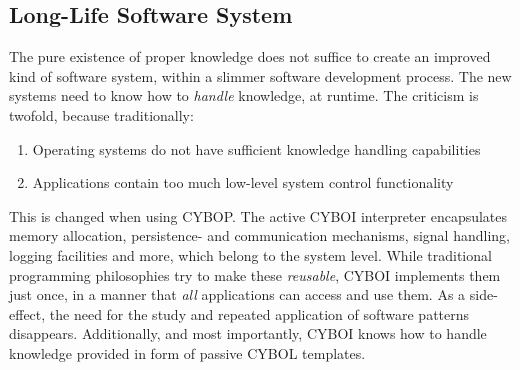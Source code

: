 %
%
%
%
%
%
%

\subsection{Long-Life Software System}
\label{long-life_software_system_heading}

The pure existence of proper knowledge does not suffice to create an improved
kind of software system, within a slimmer software development process. The new
systems need to know how to \emph{handle} knowledge, at runtime. The criticism
is twofold, because traditionally:

\begin{enumerate}
    \item Operating systems do not have sufficient knowledge handling capabilities
    \item Applications contain too much low-level system control functionality
\end{enumerate}

This is changed when using CYBOP. The active CYBOI interpreter encapsulates
memory allocation, persistence- and communication mechanisms, signal handling,
logging facilities and more, which belong to the system level. While
traditional programming philosophies try to make these \emph{reusable}, CYBOI
implements them just once, in a manner that \emph{all} applications can access
and use them. As a side-effect, the need for the study and repeated application
of software patterns disappears. Additionally, and most importantly, CYBOI
knows how to handle knowledge provided in form of passive CYBOL templates.

